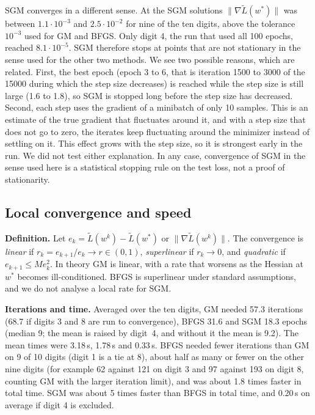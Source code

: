 \documentclass{article}
\begin{document}
SGM converges in a different sense. At the SGM solutions $\|\nabla\tilde L(w^*)\|$ was between $1.1\cdot10^{-3}$ and $2.5\cdot10^{-2}$ for nine of the ten digits, above the tolerance $10^{-3}$ used for GM and BFGS. Only digit 4, the run that used all 100 epochs, reached $8.1\cdot10^{-5}$. SGM therefore stops at points that are not stationary in the sense used for the other two methods. We see two possible reasons, which are related. First, the best epoch (epoch 3 to 6, that is iteration 1500 to 3000 of the 15000 during which the step size decreases) is reached while the step size is still large (1.6 to 1.8), so SGM is stopped long before the step size has decreased. Second, each step uses the gradient of a minibatch of only 10 samples. This is an estimate of the true gradient that fluctuates around it, and with a step size that does not go to zero, the iterates keep fluctuating around the minimizer instead of settling on it. This effect grows with the step size, so it is strongest early in the run. We did not test either explanation. In any case, convergence of SGM in the sense used here is a statistical stopping rule on the test loss, not a proof of stationarity.

\subsection{Local convergence and speed}\label{sec:local}
\textbf{Definition.} Let $e_k=\tilde L(w^k)-\tilde L(w^*)$ or $\|\nabla \tilde L(w^k)\|$. The convergence is \emph{linear} if $r_k=e_{k+1}/e_k\to r\in(0,1)$, \emph{superlinear} if $r_k\to0$, and \emph{quadratic} if $e_{k+1}\le M e_k^2$. In theory GM is linear, with a rate that worsens as the Hessian at $w^*$ becomes ill-conditioned. BFGS is superlinear under standard assumptions, and we do not analyse a local rate for SGM.

\textbf{Iterations and time.} Averaged over the ten digits, GM needed 57.3 iterations (68.7 if digits 3 and 8 are run to convergence), BFGS 31.6 and SGM 18.3 epochs (median 9; the mean is raised by digit~4, and without it the mean is 9.2). The mean times were 3.18\,s, 1.78\,s and 0.33\,s. BFGS needed fewer iterations than GM on 9 of 10 digits (digit 1 is a tie at 8), about half as many or fewer on the other nine digits (for example 62 against 121 on digit 3 and 97 against 193 on digit 8, counting GM with the larger iteration limit), and was about 1.8 times faster in total time. SGM was about 5 times faster than BFGS in total time, and 0.20\,s on average if digit 4 is excluded.
\end{document}
